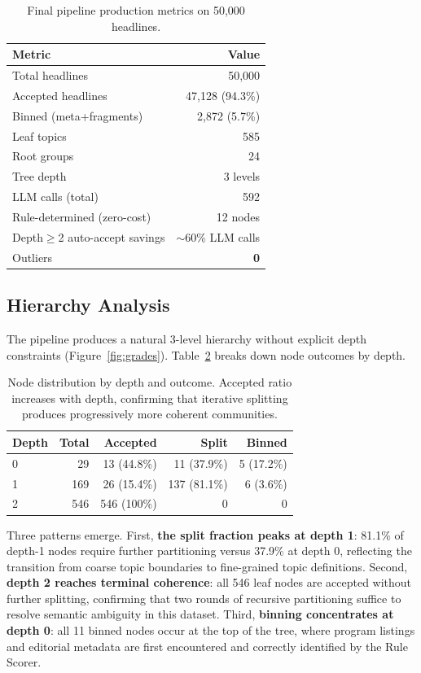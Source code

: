 \documentclass[10pt,twocolumn,twoside]{article}
\begin{document}
\begin{table}[h]
\centering
\caption{Final pipeline production metrics on 50,000 headlines.}
\label{tab:production}
\small
\begin{tabular}{lr}
\toprule
Metric & Value \\
\midrule
Total headlines & 50,000 \\
Accepted headlines & 47,128 (94.3\%) \\
Binned (meta+fragments) & 2,872 (5.7\%) \\
Leaf topics & 585 \\
Root groups & 24 \\
Tree depth & 3 levels \\
LLM calls (total) & 592 \\
Rule-determined (zero-cost) & 12 nodes \\
Depth$\geq$2 auto-accept savings & $\sim$60\% LLM calls \\
Outliers & \textbf{0} \\
\bottomrule
\end{tabular}
\end{table}

\subsection{Hierarchy Analysis}
The pipeline produces a natural 3-level hierarchy without explicit depth constraints 
(Figure~\ref{fig:grades}). Table~\ref{tab:hierarchy} breaks down node outcomes by depth.

\begin{table}[h]
\centering
\caption{Node distribution by depth and outcome. Accepted ratio increases with depth, 
confirming that iterative splitting produces progressively more coherent communities.}
\label{tab:hierarchy}
\small
\begin{tabular}{lrrrr}
\toprule
Depth & Total & Accepted & Split & Binned \\
\midrule
0 & 29 & 13 (44.8\%) & 11 (37.9\%) & 5 (17.2\%) \\
1 & 169 & 26 (15.4\%) & 137 (81.1\%) & 6 (3.6\%) \\
2 & 546 & 546 (100\%) & 0 & 0 \\
\bottomrule
\end{tabular}
\end{table}

Three patterns emerge. First, \textbf{the split fraction peaks at depth 1}: 81.1\% of depth-1 
nodes require further partitioning versus 37.9\% at depth 0, reflecting the transition from 
coarse topic boundaries to fine-grained topic definitions. Second, \textbf{depth 2 reaches 
terminal coherence}: all 546 leaf nodes are accepted without further splitting, confirming 
that two rounds of recursive partitioning suffice to resolve semantic ambiguity in this 
dataset. Third, \textbf{binning concentrates at depth 0}: all 11 binned nodes occur at the 
top of the tree, where program listings and editorial metadata are first encountered and 
correctly identified by the Rule Scorer.
\end{document}
